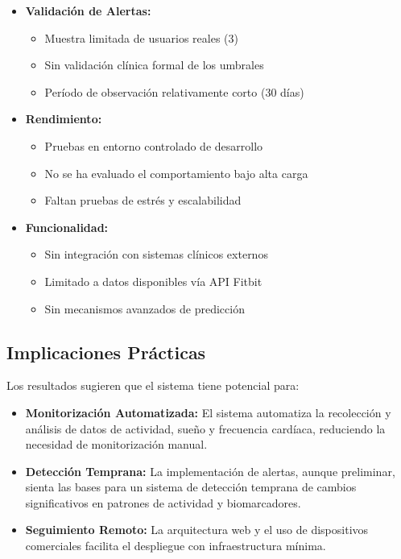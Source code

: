 \begin{itemize}
    \item \textbf{Validación de Alertas:}
        \begin{itemize}
            \item Muestra limitada de usuarios reales (3)
            \item Sin validación clínica formal de los umbrales
            \item Período de observación relativamente corto (30 días)
        \end{itemize}
    \item \textbf{Rendimiento:}
        \begin{itemize}
            \item Pruebas en entorno controlado de desarrollo
            \item No se ha evaluado el comportamiento bajo alta carga
            \item Faltan pruebas de estrés y escalabilidad
        \end{itemize}
    \item \textbf{Funcionalidad:}
        \begin{itemize}
            \item Sin integración con sistemas clínicos externos
            \item Limitado a datos disponibles vía API Fitbit
            \item Sin mecanismos avanzados de predicción
        \end{itemize}
\end{itemize}

\subsection{Implicaciones Prácticas}
\label{subsec:implicaciones}

Los resultados sugieren que el sistema tiene potencial para:

\begin{itemize}
    \item \textbf{Monitorización Automatizada:} El sistema automatiza la recolección y análisis de datos de actividad, sueño y frecuencia cardíaca, reduciendo la necesidad de monitorización manual.
    \item \textbf{Detección Temprana:} La implementación de alertas, aunque preliminar, sienta las bases para un sistema de detección temprana de cambios significativos en patrones de actividad y biomarcadores.
    \item \textbf{Seguimiento Remoto:} La arquitectura web y el uso de dispositivos comerciales facilita el despliegue con infraestructura mínima.
\end{itemize}

